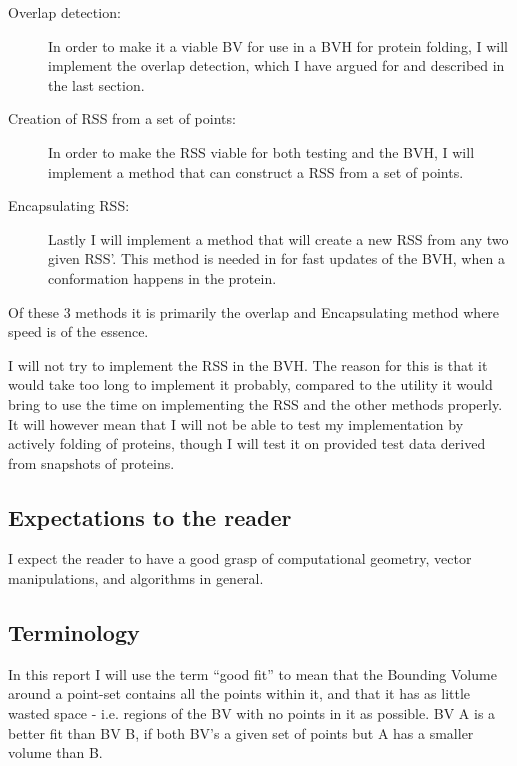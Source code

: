 \begin{description}
\item[Overlap detection:] In order to make it a viable BV for use in a BVH for protein folding, I will implement the overlap detection, which I have argued for and described in the last section. 

\item[Creation of RSS from a set of points:] In order to make the RSS viable for both testing and the BVH, I will implement a method that can construct a RSS from a set of points.
\item[Encapsulating RSS:] Lastly I will implement a method that will create a new RSS from any two given RSS'. This method is needed in for fast updates of the BVH, when a conformation happens in the protein.
\end{description}

Of these 3 methods it is primarily the overlap and Encapsulating method where speed is of the essence.

I will not try to implement the RSS in the BVH. The reason for this is that it would take too long to implement it probably, compared to the utility it would bring to use the time on implementing the RSS and the other methods properly. It will however mean that I will not be able to test my implementation by  actively folding of proteins, though I will test it on provided test data derived from snapshots of proteins.

\subsection{Expectations to the reader}
I expect the reader to have a good grasp of computational geometry, vector manipulations, and algorithms in general.

\subsection{Terminology}
In this report I will use the term ``good fit'' to mean that the Bounding Volume around a point-set contains all the points within it, and that it has as little wasted space - i.e. regions of the BV with no points in it as possible. BV A is a better fit than BV B, if both BV's a given set of points but A has a smaller volume than B.

